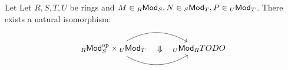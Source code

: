 \documentclass[a4paper]{report}
\begin{document}
\begin{thm}  Let Let $R, S, T, U$ be rings and $M \in {}_R\mathsf{Mod}_S, N \in {}_{S}\mathsf{Mod}_{T}, P \in {}_{U}\mathsf{Mod}_{T}$. There exists a natural isomorphism:
\[\begin{tikzcd}
{}_R\Mod_S^{\operatorname{op}} \tm {}_U\Mod_T \arrow[r, bend left] \arrow[r, bend right] \arrow[r, "\vimp", phantom] & {}_U\ModR TODO
\end{tikzcd}\]
\end{thm}
\end{document}
